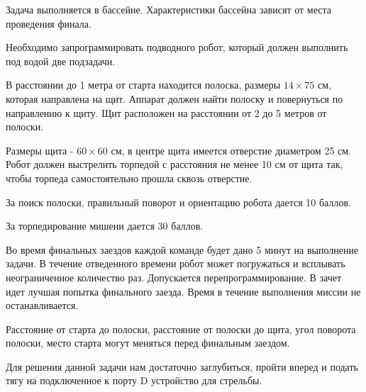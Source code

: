 
Задача выполняется в бассейне. Характеристики бассейна зависят от места проведения финала. 

Необходимо запрограммировать подводного робот, который должен выполнить под водой две подзадачи.

В расстоянии до 1 метра от старта находится полоска, размеры $14 \times 75$ см, которая направлена на щит. Аппарат должен найти полоску и повернуться по направлению к щиту. Щит расположен на расстоянии от 2 до 5 метров от полоски.

Размеры щита - $60 \times 60$ см, в центре щита имеется отверстие диаметром 25 см. Робот должен выстрелить торпедой с расстояния не менее 10 см от щита так, чтобы торпеда самостоятельно прошла сквозь отверстие.

За поиск полоски, правильный поворот и ориентацию робота дается 10 баллов.

За торпедирование мишени дается 30 баллов.

\markSection

Во время финальных заездов каждой команде будет дано 5 минут на выполнение задачи. В течение отведенного времени робот может погружаться и всплывать неограниченное количество раз. Допускается перепрограммирование. В зачет идет лучшая попытка финального заезда. Время в течение выполнения миссии не останавливается. 

Расстояние от старта до полоски, расстояние от полоски до щита, угол поворота полоски, место старта могут меняться перед финальным заездом. 

\solutionSection

Для решения данной задачи нам достаточно заглубиться, пройти вперед и подать тягу на подключенное к порту D устройство для стрельбы.

